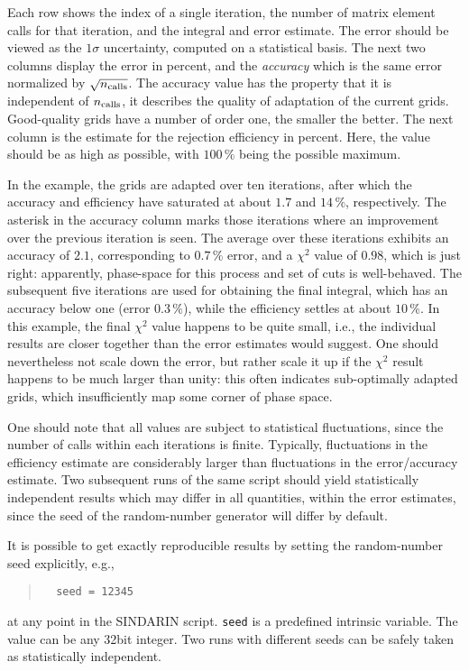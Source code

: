 \documentclass[12pt]{book}
\newcommand{\ttt}[1]{\texttt{#1}}
\begin{document}
Each row shows the index of a single iteration, the number of matrix element
calls for that iteration, and the integral and error estimate.  The error
should be viewed as the $1\sigma$ uncertainty, computed on a statistical
basis.  The next two columns display the error in percent, and the
\emph{accuracy} which is the same error normalized by $\sqrt{n_{\rm calls}}$.
The accuracy value has the property that it is independent of $n_{\rm calls}$,
it describes the quality of adaptation of the current grids.  Good-quality
grids have a number of order one, the smaller the better.  The next column is
the estimate for the rejection efficiency in percent.  Here, the value should
be as high as possible, with $100\,\%$ being the possible maximum.

In the example, the grids are adapted over ten iterations, after which the
accuracy and efficiency have saturated at about $1.7$ and $14\,\%$,
respectively.  The asterisk in the accuracy column marks those iterations
where an improvement over the previous iteration is seen.  The average over
these iterations exhibits an accuracy of $2.1$, corresponding to $0.7\,\%$
error, and a $\chi^2$ value of $0.98$, which is just right: apparently,
phase-space for this process and set of cuts is well-behaved.  The subsequent
five iterations are used for obtaining the final integral, which has an
accuracy below one (error $0.3\,\%$), while the efficiency settles at about
$10\,\%$.  In this example, the final $\chi^2$ value happens to be quite
small, i.e., the individual results are closer together than the error
estimates would suggest.  One should nevertheless not scale down the error,
but rather scale it up if the $\chi^2$ result happens to be much larger than
unity: this often indicates sub-optimally adapted grids, which insufficiently
map some corner of phase space.

One should note that all values are subject to statistical fluctuations, since
the number of calls within each iterations is finite.  Typically, fluctuations
in the efficiency estimate are considerably larger than fluctuations in the
error/accuracy estimate.  Two subsequent runs of the same script should yield
statistically independent results which may differ in all quantities, within
the error estimates, since the seed of the random-number generator will differ
by default.

It is possible to get exactly reproducible results by setting the
random-number seed explicitly, e.g.,
\begin{quote}
\begin{footnotesize}
\begin{verbatim}
  seed = 12345  
\end{verbatim}
\end{footnotesize}
\end{quote}
at any point in the SINDARIN script.  \ttt{seed} is a predefined intrinsic
variable.  The value can be any 32bit integer.  Two runs with different seeds
can be safely taken as statistically independent.
\end{document}

